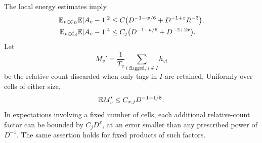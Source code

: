 \begin{lemma}\label{lem:local-counts}
The local energy estimates imply
\begin{equation}\label{eq:flag-moments}
 \begin{aligned}
 \mathbb E_{v\in\mathcal C_R}\mathbb E|A_v-1|^2
   &\le C\bigl(D^{-1-w/6}+D^{-1+x}R^{-3}\bigr),\\
 \mathbb E_{v\in\mathcal C_d}\mathbb E|A_v-1|^4
   &\le C_j\bigl(D^{-1-u/6}+D^{-2+2x}\bigr).
 \end{aligned}
\end{equation}
Let
\[
 M_v'=\frac1{T_v}\sum_{i\text{ flagged},\ i\notin I}h_{vi}
\]
be the relative count discarded when only tags in $I$ are retained.
Uniformly over cells of either size,
\begin{equation}\label{eq:tag-omission}
                    \mathbb E M_v'\le C_{x,j}D^{-1-1/8}.
\end{equation}
In expectations involving a fixed number of cells, each additional
relative-count factor can be bounded by $C_jD^x$, at an error smaller
than any prescribed power of $D^{-1}$.  The same assertion holds for
fixed products of such factors.
\end{lemma}

